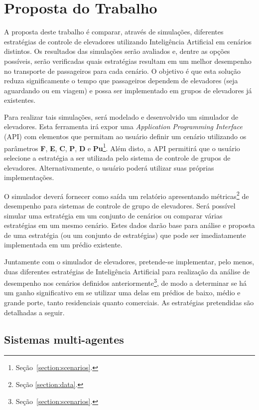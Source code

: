 \chapter{\label{chap:proposal}Proposta do Trabalho}

A proposta deste trabalho é comparar, através de simulações, diferentes
estratégias de controle de elevadores utilizando Inteligência Artificial em
cenários distintos. Os resultados das simulações serão avaliados e, dentre as
opções possíveis, serão verificadas quais estratégias resultam em um melhor
desempenho no transporte de passageiros para cada cenário. O objetivo é que esta
solução reduza significamente o tempo que passageiros dependem de elevadores
(seja aguardando ou em viagem) e possa ser implementado em grupos de elevadores
já existentes.

Para realizar tais simulações, será modelado e desenvolvido um simulador de
elevadores. Esta ferramenta irá expor uma \textit{Application Programming
Interface} (API) com elementos que permitam ao usuário definir um cenário
utilizando os parâmetros \textbf{F}, \textbf{E}, \textbf{C}, \textbf{P},
\textbf{D} e \textbf{Pu}\footnote{Seção~\ref{section:scenarios}.}. Além disto, a
API permitirá que o usuário selecione a estratégia a ser utilizada pelo sistema
de controle de grupos de elevadores. Alternativamente, o usuário poderá utilizar
suas próprias implementações.

O simulador deverá fornecer como saída um relatório apresentando
métricas\footnote{Seção \ref{section:data}.} de desempenho para sistemas de
controle de grupo de elevadores. Será possível simular uma estratégia em um
conjunto de cenários ou comparar várias estratégias em um mesmo cenário. Estes
dados darão base para análise e proposta de uma estratégia (ou um conjunto de
estratégias) que pode ser imediatamente implementada em um prédio existente.

Juntamente com o simulador de elevadores, pretende-se implementar, pelo menos,
duas diferentes estratégias de Inteligência Artificial para realização da
análise de desempenho nos cenários definidos
anteriormente\footnote{Seção~\ref{section:scenarios}.}, de modo a determinar se
há um ganho significativo em se utilizar uma delas em prédios de baixo, médio e
grande porte, tanto residenciais quanto comerciais. As estratégias pretendidas
são detalhadas a seguir.

\section{\label{section:multiagentes}Sistemas multi-agentes}

